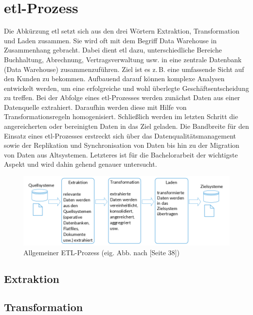 \section{\acrshort{etl}-Prozess}
Die Abkürzung \acrshort{etl} setzt sich aus den drei Wörtern Extraktion, Transformation und Laden zusammen. Sie wird oft mit dem Begriff Data Warehouse in Zusammenhang gebracht. Dabei dient \acrshort{etl} dazu, unterschiedliche Bereiche Buchhaltung, Abrechnung, Vertragsverwaltung usw. in eine zentrale Datenbank (Data Warehouse) zusammenzuführen. Ziel ist es z.\,B. eine umfassende Sicht auf den Kunden zu bekommen. Aufbauend darauf können komplexe Analysen entwickelt werden, um eine erfolgreiche und wohl überlegte Geschäftsentscheidung zu treffen. Bei der Abfolge eines \acrshort{etl}-Prozesses werden zunächst Daten aus einer Datenquelle extrahiert. Daraufhin werden diese mit Hilfe von Transformationsregeln homogenisiert. Schließlich werden im letzten Schritt die angereicherten oder bereinigten Daten in das Ziel geladen. Die Bandbreite für den Einsatz eines \acrshort{etl}-Prozesses erstreckt sich über das Datenqualitätsmanagement sowie der Replikation und Synchronisation von Daten bis hin zu der Migration von Daten aus Altsystemen. Letzteres ist für die Bachelorarbeit der wichtigste Aspekt und wird dahin gehend genauer untersucht. \cite{Rossak2013}
\begin{figure}[ht]
	\begin{center}
		\includegraphics[scale=0.65]{bilder/ETL-Prozess.png}
		\caption{Allgemeiner ETL-Prozess (eig. Abb. nach \cite{Rossak2013}[Seite 38])}
		\label{pic:ETL:Pro}
	\end{center}
\end{figure}
\subsection{Extraktion}

\subsection{Transformation}
